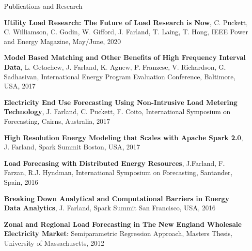 \documentclass{resume} %
\begin{document}
\begin{rSection}{Publications and Research}

\item {\bf Utility Load Research: The Future of Load Research is Now}, C. Puckett, C. Williamson, C. Godin, W. Gifford, J. Farland, T. Laing, T. Hong, IEEE Power and Energy Magazine, May/June, 2020

\item {\bf Model Based Matching and Other Benefits of High Frequency Interval Data}, L. Getachew, J. Farland, K. Agnew, P. Franzese, V. Richardson, G. Sadhasivan, International Energy Program Evaluation Conference, Baltimore, USA, 2017

\item {\bf Electricity End Use Forecasting Using Non-Intrusive Load Metering Technology}, J. Farland, C. Puckett, F. Coito, International Symposium on Forecasting, Cairns, Australia, 2017

\item {\bf High Resolution Energy Modeling that Scales with Apache Spark 2.0}, J. Farland, Spark Summit Boston, USA, 2017

\item {\bf Load Forecasing with Distributed Energy Resources}, J.Farland, F. Farzan, R.J. Hyndman, International Symposium on Forecasting, Santander, Spain, 2016

\item {\bf Breaking Down Analytical and Computational Barriers in Energy Data Analytics}, J. Farland, Spark Summit San Francisco, USA, 2016

\item {\bf  Zonal and Regional Load Forecasting in The New England Wholesale Electricity Market}: Semiparametric Regression Approach, Masters Thesis, University of Massachusetts, 2012

\end{rSection}

\end{document}
